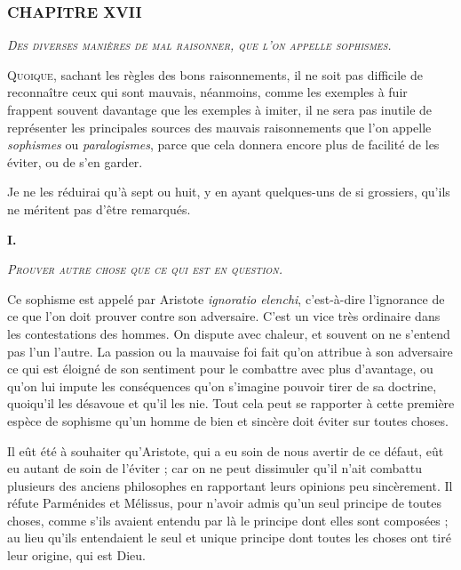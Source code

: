 \subsubsection{\centering \Large CHAPITRE XVII}
\begin{center}\emph{\large\scshape Des diverses manières de mal raisonner, que l'on appelle sophismes.}\end{center}

	\lettrine{Q}{uoique}, sachant les règles des bons raisonnements, il ne soit pas difficile de reconnaître ceux qui sont mauvais, néanmoins, comme les exemples à fuir frappent souvent davantage que les exemples à imiter, il ne sera pas inutile de représenter les principales sources des mauvais raisonnements que l'on appelle \emph{sophismes} ou \emph{paralogismes}, parce que cela donnera encore plus de facilité de les éviter, ou de s'en garder.

Je ne les réduirai qu'à sept ou huit, y en ayant quelques-uns de si grossiers, qu'ils ne méritent pas d'être remarqués.

\begin{center}{\bfseries\large I.}\end{center}
\begin{center}\emph{\scshape Prouver autre chose que ce qui est en question.}\end{center}

Ce sophisme est appelé par Aristote \emph{ignoratio elenchi}, c'est-à-dire l'ignorance de ce que l'on doit prouver contre son adversaire. C'est un vice très ordinaire dans les contestations des hommes. On dispute avec chaleur, et souvent on ne s'entend pas l'un l'autre. La passion ou la mauvaise foi fait qu'on attribue à son adversaire ce qui est éloigné de son sentiment pour le combattre avec plus d'avantage, ou qu'on lui impute les conséquences qu'on s'imagine pouvoir tirer de sa doctrine, quoiqu'il les désavoue et qu'il les nie. Tout cela peut se rapporter à cette première espèce de sophisme qu'un homme de bien et sincère doit éviter sur toutes choses.

Il eût été à souhaiter qu'Aristote, qui a eu soin de nous avertir de ce défaut, eût eu autant de soin de l'éviter ; car on ne peut dissimuler qu'il n'ait combattu plusieurs des anciens philosophes en rapportant leurs opinions peu sincèrement. Il réfute Parménides et Mélissus, pour n'avoir admis qu'un seul principe de toutes choses, comme s'ils avaient entendu par là le principe dont elles sont composées ; au lieu qu'ils entendaient le seul et unique principe dont toutes les choses ont tiré leur origine, qui est Dieu.


